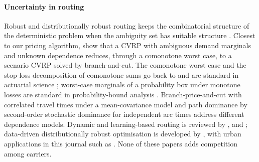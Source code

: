 \documentclass[preprint,12pt]{elsarticle}
\theoremstyle{definition}
\theoremstyle{remark}
\begin{document}
\paragraph{Uncertainty in routing} Robust and distributionally robust routing keeps the combinatorial structure of the deterministic problem when the ambiguity set has suitable structure \citep{Gounaris2013,GhosalWiesemann2020,Zhang2021,Jaillet2016,Adulyasak2016}. Closest to our pricing algorithm, \citet{GhosalHoWiesemann2024} show that a CVRP with ambiguous demand marginals and unknown dependence reduces, through a comonotone worst case, to a scenario CVRP solved by branch-and-cut. The comonotone worst case and the stop-loss decomposition of comonotone sums go back to \citet{Meilijson1979} and are standard in actuarial science \citep{Kaas2000,Dhaene2002}; worst-case marginals of a probability box under monotone losses are standard in probability-bound analysis \citep{Williamson1990}. Branch-price-and-cut with correlated travel times under a mean-covariance model \citep{Rostami2021} and path dominance by second-order stochastic dominance for independent arc times \citep{Nie2012} address different dependence models. Dynamic and learning-based routing is reviewed by \citet{Soeffker2022}, \citet{Ulmer2020} and \citet{Hildebrandt2023}; data-driven distributionally robust optimisation is developed by \citet{MohajerinEsfahani2018}, with urban applications in this journal such as \citet{Wang2023omega}. None of these papers adds competition among carriers.
\end{document}

